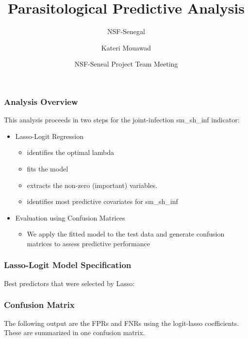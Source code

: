 \documentclass{beamer}
\title[Predictive Analysis] %
{Parasitological Predictive Analysis}
\subtitle{NSF-Senegal}
\author{Kateri Mouawad} %
\date[June 2025] %
{NSF-Seneal Project Team Meeting}
\begin{document}
\frame{\titlepage}

\begin{frame}
\frametitle{Analysis Overview}
This analysis proceeds in two steps for the joint-infection sm\_sh\_inf indicator:

\begin{itemize}
    \item<1-> Lasso-Logit Regression
       \begin{itemize}
             \item<2-> identifies the optimal lambda
             \item<3-> fits the model
             \item<4-> extracts the non-zero (important) variables.
             \item<5-> identifies most predictive covariates for sm\_sh\_inf
        \end{itemize}
    \item<3-> Evaluation using Confusion Matrices
         \begin{itemize}
                 \item<4-> We apply the fitted model to the test data and generate confusion matrices to assess predictive performance
         \end{itemize}
\end{itemize}

\end{frame}


\begin{frame}
\frametitle{Lasso-Logit Model Specification}

Best predictors that were selected by Lasso:


\end{frame}

\begin{frame}
\frametitle{Confusion Matrix}
The following output are the FPRs and FNRs using the logit-lasso coefficients. These are summarized in one confusion matrix.





\end{frame}
\end{document}
